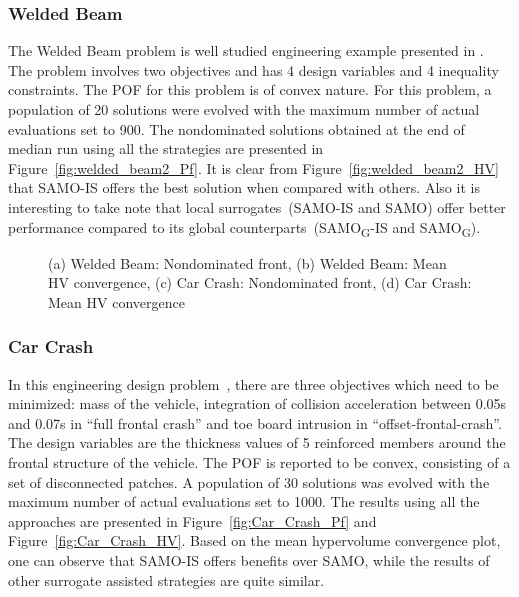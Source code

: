 \subsubsection{Welded Beam} The Welded Beam problem is well studied engineering example presented in
\cite{Deb2000constraint}. The problem involves two objectives and has 4 design variables and 4
inequality constraints. The POF for this problem is of convex nature. For this problem, a population
of 20 solutions were evolved with the maximum number of actual evaluations set to 900. The nondominated solutions obtained at the end of median run using all the strategies are presented in Figure~\ref{fig:welded_beam2_Pf}. It is clear from
Figure~\ref{fig:welded_beam2_HV} that SAMO-IS offers the best solution when compared with others.
Also it is interesting to take note that local surrogates~(SAMO-IS and SAMO) offer better
performance compared to its global counterparts~(SAMO\textsubscript{G}-IS and
SAMO\textsubscript{G}).

\begin{figure*}[!htb] \centering
	\caption{(a) Welded Beam: Nondominated front, (b) Welded Beam: Mean HV convergence, (c) Car Crash: Nondominated front, (d) Car Crash: Mean HV convergence}
	\label{fig:welded_beam2_Pareto} \end{figure*}

\subsubsection{Car Crash} In this engineering design problem~\cite{Liao2008crash}, there are three
objectives which need to be minimized: mass of the vehicle, integration of collision acceleration
between 0.05s and 0.07s in ``full frontal crash'' and toe board intrusion in
``offset-frontal-crash''. The design variables are the thickness values of 5 reinforced members
around the frontal structure of the vehicle. The POF is reported to be convex, consisting of a set
of disconnected patches. A population of 30 solutions was evolved with the maximum number of actual
evaluations set to 1000. The results using all the approaches are presented in
Figure~\ref{fig:Car_Crash_Pf} and Figure~\ref{fig:Car_Crash_HV}. Based on the mean hypervolume convergence plot, one can observe
that SAMO-IS offers benefits over SAMO, while the results of other surrogate assisted strategies are
quite similar.

